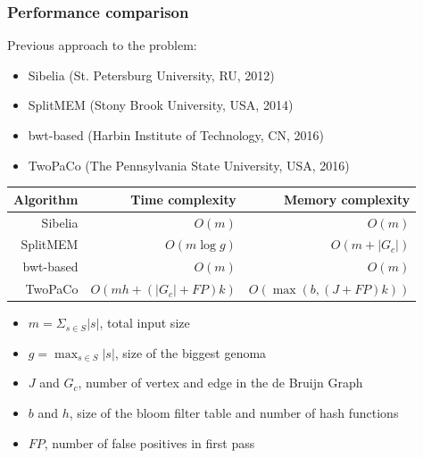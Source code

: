 \begin{frame}
	\frametitle{Performance comparison}
	
	\centering
	
	
	  Previous approach to the problem:
	
	  \begin{itemize}
	    \item Sibelia (St. Petersburg University, RU, 2012)
	    \item SplitMEM (Stony Brook University, USA, 2014)
	    \item bwt-based (Harbin Institute of Technology, CN, 2016)
	    \item TwoPaCo (The Pennsylvania State University, USA, 2016)
	  \end{itemize}

	
	  \medskip
	  
	  \begin{tabular}{ r | r | r }
    \hline
    Algorithm  &           Time complexity &        Memory complexity   \\ \hline
    Sibelia    & $O(m)$                    & $O(m)$                     \\
    SplitMEM   & $O(m \log{g})$            & $O(m + |G_{c}|)$           \\
    bwt-based  & $O(m)$                    & $O(m)$                     \\
    TwoPaCo    & $O(mh + (|G_{c}| + FP)k)$ & $O( \max(b, (J+FP)k) )$    \\    
    \hline
    \end{tabular}
    
    \medskip

	
    \begin{itemize}
      \item $m = \Sigma_{s \in S}{ |s| }$, total input size
      \item $g = \max_{s \in S}{ |s| }$, size of the biggest genoma
      \item $J$ and $G_{c}$, number of vertex and edge in the de Bruijn Graph
      \item $b$ and $h$, size of the bloom filter table and number of hash functions
      \item $FP$, number of false positives in first pass
    \end{itemize}
    

\end{frame}

